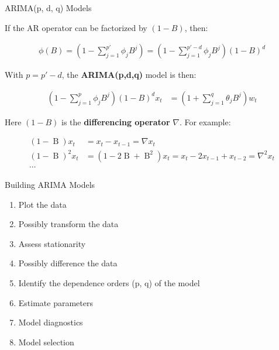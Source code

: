 \documentclass[ignorenonframetext,xcolor=x11names]{beamer}
\begin{document}
\begin{frame}[label=advanced]{ARIMA(p, d, q) Models}

If the AR operator can be factorized by $(1-B)$, then:

\begin{align*}
\phi (B) = \left(1 - \sum_{j=1}^{p'} \phi_j B^j \right) = \left(1 - \sum_{j=1}^{p'-d} \phi_j B^j \right) (1 - B)^d 
\end{align*}

With $p=p'-d$, the \textbf{ARIMA(p,d,q)} model is then:

\begin{align*}
\left( 1 - \sum_{j=1}^p \phi_j B^j \right) (1-B)^d x_t &= \left( 1 + \sum_{j=1}^q \theta_j B^j \right) w_t
\end{align*}

Here $(1-B)$ is the \textbf{differencing operator} $\nabla$. For example:

\begin{align*}
(1-\operatorname{B})x_t &= x_t - x_{t-1}  = \nabla x_t \\
(1-\operatorname{B})^2 x_t &= (1-2 \operatorname{B} + \operatorname{B}^2)x_t = x_t - 2x_{t-1} + x_{t-2} = \nabla^2 x_t\\
\cdots
\end{align*}

\end{frame}

\begin{frame}[label=full]{Building ARIMA Models}
\begin{enumerate}
  \item Plot the data
  \item Possibly transform the data
  \item Assess stationarity
  \item Possibly difference the data
  \item Identify the dependence orders (p, q) of the model
  \item Estimate parameters
  \item Model diagnostics
  \item Model selection
\end{enumerate}
\end{frame}
\end{document}
